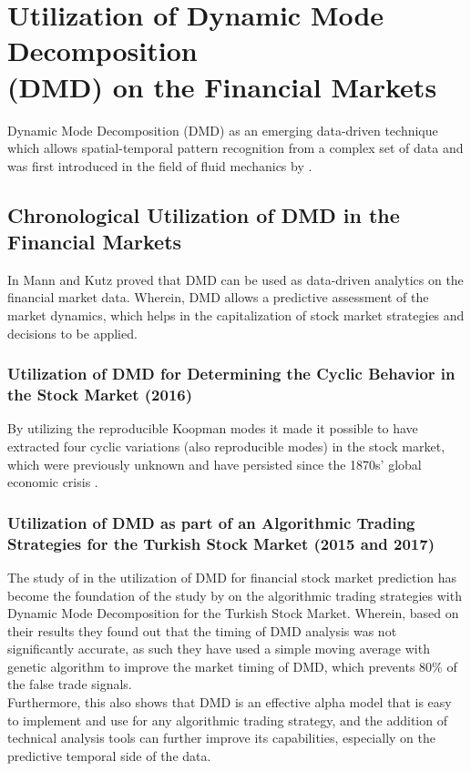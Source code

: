 \section{Utilization of Dynamic Mode Decomposition\\(DMD) on the Financial Markets}
\label{sec:utilization_dmd}
Dynamic Mode Decomposition (DMD) as an emerging data-driven technique 
which allows spatial-temporal pattern recognition from a complex set of 
data and was first introduced in the field of fluid mechanics by 
\cite{SCHMID2010}.
\subsection{Chronological Utilization of DMD in the Financial Markets}
\label{subsec:chronological_utilization_dmd}
In \citeyear{Mann2015} Mann and Kutz proved that DMD can be used as data-driven analytics 
on the financial market data. Wherein, DMD allows a predictive assessment of 
the market dynamics, which helps in the capitalization of stock market 
strategies and decisions to be applied.
\subsubsection{Utilization of DMD for Determining the Cyclic Behavior in the Stock Market (2016)}
\label{subsubsec:dmd_cyclic_behavior}
By utilizing the reproducible Koopman modes it made it possible to have extracted 
four cyclic variations (also reproducible modes) in the stock market, which 
were previously unknown and have persisted since the 1870s’ 
global economic crisis
\cite{Hua2016,Williamson2015}.
\subsubsection{Utilization of DMD as part of an Algorithmic Trading Strategies for the Turkish Stock Market (2015 and 2017)}
\label{subsubsec:dmd_algorithmic_trading}
The study of  in the utilization of DMD for financial stock market 
prediction has become the foundation of the study by  
on the algorithmic trading strategies with Dynamic Mode Decomposition 
for the Turkish Stock Market. Wherein, based on their results they found out 
that the timing of DMD analysis was not significantly accurate, as such they 
have used a simple moving average with genetic algorithm to improve the market 
timing of DMD, which prevents 80\% of the false trade signals.
\\Furthermore, this also shows that DMD is an effective alpha 
model that is easy to implement and use for any algorithmic trading 
strategy, and the addition of technical analysis tools can further improve 
its capabilities, especially on the predictive temporal side of the data.
